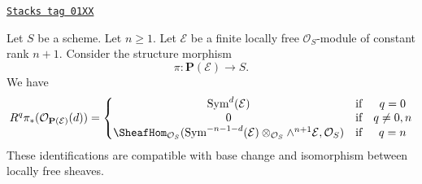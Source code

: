 \begin{lemma}
\label{coherent-lemma-cohomology-projective-bundle}
\href{https://stacks.math.columbia.edu/tag/01XX}{\texttt{Stacks tag 01XX}}

Let $S$ be a scheme. Let $n \geq 1$.
Let $\mathcal{E}$ be a finite locally
free $\mathcal{O}_S$-module of constant rank $n + 1$.
Consider the structure morphism
$$
\pi : \mathbf{P}(\mathcal{E}) \longrightarrow S.
$$
We have
$$
R^q\pi_*(\mathcal{O}_{\mathbf{P}(\mathcal{E})}(d)) =
\left\{
\begin{matrix}
\text{Sym}^d(\mathcal{E}) & \text{if} & q = 0 \\
0 & \text{if} & q \not = 0, n \\
\SheafHom_{\mathcal{O}_S}(
\text{Sym}^{- n - 1 - d}(\mathcal{E})
\otimes_{\mathcal{O}_S}
\wedge^{n + 1}\mathcal{E},
\mathcal{O}_S)
& \text{if} & q = n
\end{matrix}
\right.
$$
These identifications are compatible with base change and
isomorphism between locally free sheaves.
\end{lemma}

